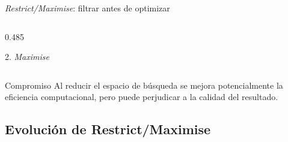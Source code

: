 \documentclass[aspectratio=169,11pt]{beamer}
\begin{document}
\begin{frame}[t]{\textit{Restrict/Maximise}: filtrar antes de optimizar}
\begin{columns}[T,onlytextwidth]
\begin{column}{0.485\textwidth}
\begin{block}{2. \textit{Maximise}}
\begin{center}
        \end{center}
      \end{block}
    \end{column}
  \end{columns}
  \vspace{0.08cm}
  \begin{alertblock}{Compromiso}
    Al reducir el espacio de búsqueda se mejora potencialmente
    la eficiencia computacional, pero puede perjudicar a la calidad del resultado.
  \end{alertblock}
\end{frame}

\subsection{Evolución de Restrict/Maximise}
\end{document}
